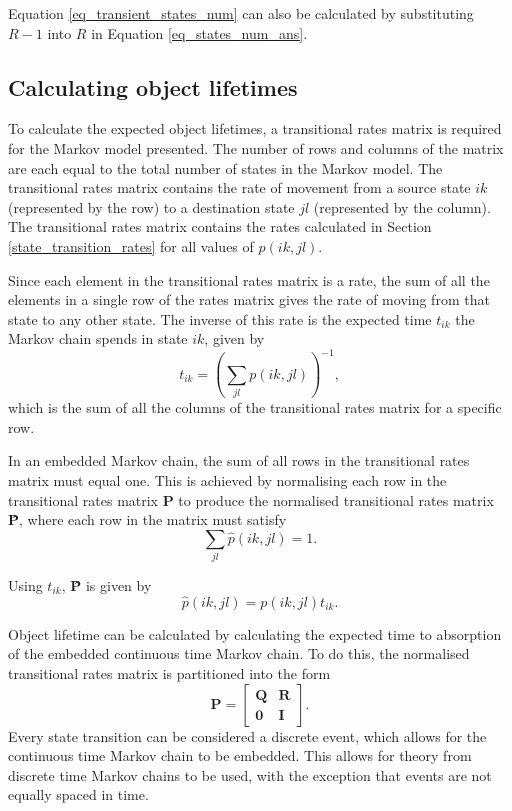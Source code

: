 Equation \eqref{eq_transient_states_num} can also be calculated by substituting $R-1$ into $R$ in Equation \eqref{eq_states_num_ans}.

\subsection{Calculating object lifetimes}

To calculate the expected object lifetimes, a transitional rates matrix is required for the Markov model presented. The number of rows and columns of the matrix are each equal to the total number of states in the Markov model. The transitional rates matrix contains the rate of movement from a source state $ik$ (represented by the row) to a destination state $jl$ (represented by the column). The transitional rates matrix contains the rates calculated in Section \ref{state_transition_rates} for all values of $p(ik, jl)$.

Since each element in the transitional rates matrix is a rate, the sum of all the elements in a single row of the rates matrix gives the rate of moving from that state to any other state. The inverse of this rate is the expected time $t_{ik}$ the Markov chain spends in state $ik$, given by
%
\begin{equation} \label{eq_markov_rates}
    t_{ik} = \left(\sum_{jl} p(ik, jl)\right)^{-1},
\end{equation}
%
which is the sum of all the columns of the transitional rates matrix for a specific row.

In an embedded Markov chain, the sum of all rows in the transitional rates matrix must equal one. This is achieved by normalising each row in the transitional rates matrix \textbf{P} to produce the normalised transitional rates matrix \textbf{\^{P}}, where each row in the matrix must satisfy
%
\begin{equation} \label{eq_markov_sum}
    \sum_{jl} \hat{p}(ik, jl) = 1.
\end{equation}

Using $t_{ik}$, \textbf{\^{P}} is given by
%
\begin{equation} \label{eq_markov_normalisation}
    \hat{p}(ik, jl) = p(ik, jl) t_{ik}.
\end{equation}

Object lifetime can be calculated by calculating the expected time to absorption of the embedded continuous time Markov chain. To do this, the normalised transitional rates matrix is partitioned into the form
%
\begin{equation} \label{matrix_partition}
    \textbf{\^{P}} = \left[\begin{array}{c|c}
                   \textbf{Q} & \textbf{R} \\
                   \hline
                   \textbf{0} & \textbf{I}
                 \end{array}\right].
\end{equation}
%
Every state transition can be considered a discrete event, which allows for the continuous time Markov chain to be embedded. This allows for theory from discrete time Markov chains to be used, with the exception that events are not equally spaced in time.

